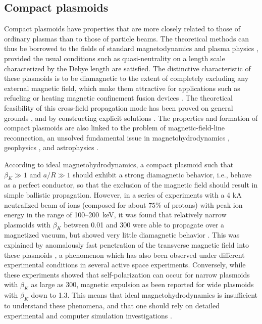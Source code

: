 \documentclass [12pt,a4paper,     ]{report} %
\begin{document}
\subsection{Compact plasmoids}


Compact plasmoids have properties that are more closely related to those of ordinary plasmas than to those of particle beams.  The theoretical methods can thus be borrowed to the fields of standard magnetodynamics and plasma physics \cite{TUCK-1959-}, provided the usual conditions such as quasi-neutrality on a length scale characterized by the Debye length are satisfied.  The distinctive characteristic of these plasmoids is to be diamagnetic to the extent of completely excluding any external magnetic field, which make them attractive for applications such as refueling \cite{PARKS1988-} or heating magnetic confinement fusion devices \cite{MANHE1977-}.  The theoretical feasibility of this cross-field propagation mode has been proved on general grounds \cite[Appendix]{MANHE1977-}, and by constructing explicit solutions \cite{POUKE1967-}.  The properties and formation of compact plasmoids are also linked to the problem of magnetic-field-line reconnection, an unsolved fundamental issue in magnetohydrodynamics \cite{BRUNE1982-}, geophysics \cite{ABE--2001-}, and astrophysics \cite{BLACK1994-}.

 
   According to ideal magnetohydrodynamics, a compact plasmoid such that $\beta_K \gg 1$ and $a/R \gg 1$ should exhibit a strong diamagnetic behavior, i.e., behave as a perfect conductor, so that the exclusion of the magnetic field should result in simple ballistic propagation.  However, in a series of experiments with a 4 kA neutralized beam of ions (composed for about 75\% of protons) with peak ion energy in the range of 100--200~keV, it was found that relatively narrow plasmoids with $\beta_K$ between 0.01 and 300 were able to propagate over a magnetized vacuum, but showed very little diamagnetic behavior \cite{HONG-1988-, WESSE1988-}.  This was explained by anomalously fast penetration of the transverse magnetic field into these plasmoids \cite{WESSE1990-, WESSE1988-, SONG1990-}, a phenomenon which has also been observed under different experimental conditions in several active space experiments.  Conversely, while these experiments showed that self-polarization can occur for narrow plasmoids with $\beta_K$ as large as 300, magnetic expulsion as been reported \cite{SONG1990-} for wide plasmoids with $\beta_K$ down to 1.3. This means that ideal magnetohydrodynamics is insufficient to understand these phenomena, and that one should rely on detailed experimental and computer simulation investigations \cite{BRENN2005-}.    
\end{document}
